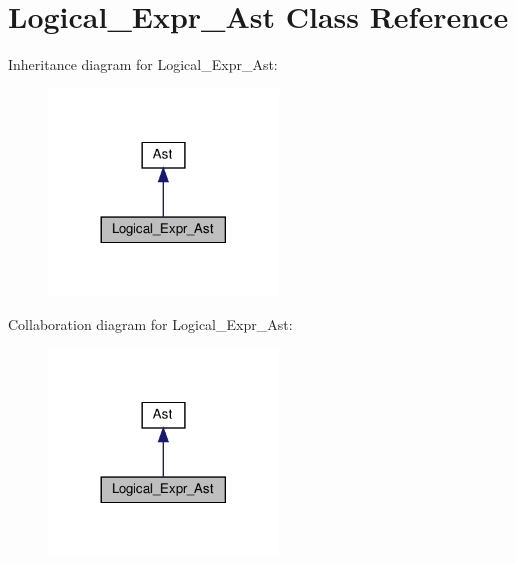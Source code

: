 \hypertarget{classLogical__Expr__Ast}{}\section{Logical\+\_\+\+Expr\+\_\+\+Ast Class Reference}
\label{classLogical__Expr__Ast}


Inheritance diagram for Logical\+\_\+\+Expr\+\_\+\+Ast\+:
\nopagebreak
\begin{figure}[H]
\begin{center}
\leavevmode
\includegraphics[width=173pt]{classLogical__Expr__Ast__inherit__graph}
\end{center}
\end{figure}


Collaboration diagram for Logical\+\_\+\+Expr\+\_\+\+Ast\+:
\nopagebreak
\begin{figure}[H]
\begin{center}
\leavevmode
\includegraphics[width=173pt]{classLogical__Expr__Ast__coll__graph}
\end{center}
\end{figure}
